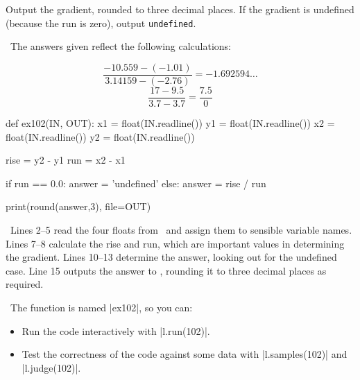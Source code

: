 Output the gradient, rounded to three decimal places.  If the gradient is undefined
(because the run is zero), output \texttt{undefined}.

\Sample

               {}
               {}

\Explanation\ The answers given reflect the following calculations:

\vspace{-5mm}
\minipagesthree{\[\frac{3.5-1}{10-5} = 2.5\]}
               {\[\frac{-10.559 - (-1.01)}{3.14159 - (-2.76)} = -1.692594\ldots\]}
               {\[\frac{17 - 9.5}{3.7 - 3.7} = \frac{7.5}{0}\]}


\Solution

\begin{pythoncode} 
  def ex102(IN, OUT):
    x1 = float(IN.readline())
    y1 = float(IN.readline())
    x2 = float(IN.readline())
    y2 = float(IN.readline())

    rise = y2 - y1
    run  = x2 - x1

    if run == 0.0:
      answer = 'undefined'
    else:
      answer = rise / run

    print(round(answer,3), file=OUT)
\end{pythoncode}

\Explanation\ Lines 2--5 read the four floats from \IN\ and assign them to sensible
variable names. Lines 7--8 calculate the rise and run, which are important values in
determining the gradient. Lines 10--13 determine the answer, looking out for the undefined
case. Line 15 outputs the answer to \OUT, rounding it to three decimal places as required.

\Running\ The function is named \pycode|ex102|, so you can:
\begin{itemize}
  \item Run the code interactively with \pycode|l.run(102)|.
  \item Test the correctness of the code against some data with \pycode|l.samples(102)|
    and \pycode|l.judge(102)|.
\end{itemize}
